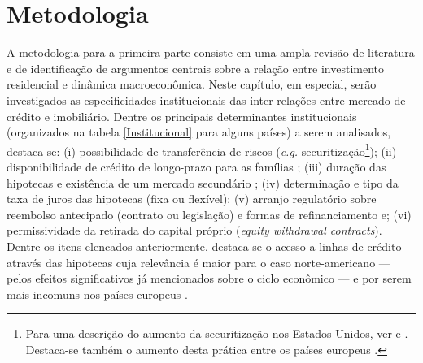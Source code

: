 \section{Metodologia}\label{passos}




A metodologia para a primeira parte consiste em uma ampla revisão de literatura e de identificação de argumentos centrais sobre a relação entre investimento residencial e dinâmica macroeconômica. Neste capítulo, em especial, serão investigados as especificidades institucionais das inter-relações entre mercado de crédito e imobiliário. Dentre os principais determinantes institucionais (organizados na tabela \ref{Institucional} para alguns países) a serem analisados, destaca-se: (i) possibilidade de transferência de riscos (\textit{e.g.} securitização\footnote{Para uma descrição do aumento da securitização nos Estados Unidos, ver \textcite{green_american_2005} e \textcite{cagnin_o_2009}. Destaca-se também o aumento desta prática entre os países europeus \cite{european_central_bank_housing_2010}.}); (ii) disponibilidade de crédito de longo-prazo para as famílias \cite{schwartz_politics_2009}; (iii) duração das hipotecas e existência de um mercado secundário \cite{green_american_2005}; (iv) determinação  e tipo da taxa de juros das hipotecas (fixa ou flexível); (v) arranjo regulatório sobre reembolso antecipado (contrato ou legislação) e formas de refinanciamento e; (vi) permissividade da retirada do capital próprio (\textit{equity withdrawal contracts}). Dentre os itens elencados anteriormente, destaca-se o acesso a linhas de crédito através das hipotecas cuja relevância é maior para o caso norte-americano --- pelos efeitos significativos já mencionados sobre o ciclo econômico --- e por serem mais incomuns nos países europeus \cite[p.~95]{van_gunten_varieties_2018}.

